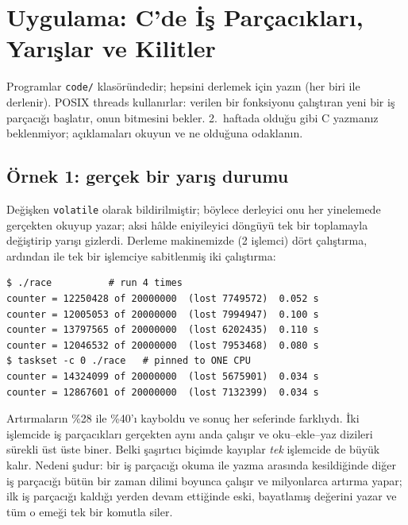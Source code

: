 \section{Uygulama: C'de İş Parçacıkları, Yarışlar ve Kilitler}

Programlar \texttt{code/} klasöründedir; hepsini derlemek için  yazın (her biri  ile derlenir). POSIX threads kullanırlar:  verilen bir fonksiyonu çalıştıran yeni bir iş parçacığı başlatır,  onun bitmesini bekler. 2.~haftada olduğu gibi C yazmanız beklenmiyor; açıklamaları okuyun ve ne olduğuna odaklanın.

\subsection{Örnek 1: gerçek bir yarış durumu}



Değişken \texttt{volatile} olarak bildirilmiştir; böylece derleyici onu her yinelemede gerçekten okuyup yazar; aksi hâlde eniyileyici döngüyü tek bir toplamayla değiştirip yarışı gizlerdi. Derleme makinemizde (2 işlemci) dört çalıştırma, ardından  ile tek bir işlemciye sabitlenmiş iki çalıştırma:

\begin{lstlisting}[style=term]
$ ./race          # run 4 times
counter = 12250428 of 20000000  (lost 7749572)  0.052 s
counter = 12005053 of 20000000  (lost 7994947)  0.100 s
counter = 13797565 of 20000000  (lost 6202435)  0.110 s
counter = 12046532 of 20000000  (lost 7953468)  0.080 s
$ taskset -c 0 ./race   # pinned to ONE CPU
counter = 14324099 of 20000000  (lost 5675901)  0.034 s
counter = 12867601 of 20000000  (lost 7132399)  0.034 s
\end{lstlisting}

Artırmaların \%28 ile \%40'ı kayboldu ve sonuç her seferinde farklıydı. İki işlemcide iş parçacıkları gerçekten aynı anda çalışır ve oku--ekle--yaz dizileri sürekli üst üste biner. Belki şaşırtıcı biçimde kayıplar \emph{tek} işlemcide de büyük kalır. Nedeni şudur: bir iş parçacığı okuma ile yazma arasında kesildiğinde diğer iş parçacığı bütün bir zaman dilimi boyunca çalışır ve milyonlarca artırma yapar; ilk iş parçacığı kaldığı yerden devam ettiğinde eski, bayatlamış değerini yazar ve tüm o emeği tek bir komutla siler.

